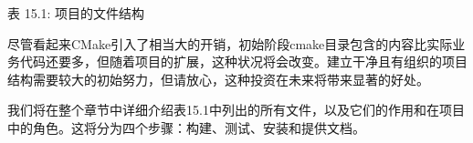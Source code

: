 \begin{center}
表 15.1: 项目的文件结构
\end{center}

尽管看起来CMake引入了相当大的开销，初始阶段cmake目录包含的内容比实际业务代码还要多，但随着项目的扩展，这种状况将会改变。建立干净且有组织的项目结构需要较大的初始努力，但请放心，这种投资在未来将带来显著的好处。

我们将在整个章节中详细介绍表15.1中列出的所有文件，以及它们的作用和在项目中的角色。这将分为四个步骤：构建、测试、安装和提供文档。















































